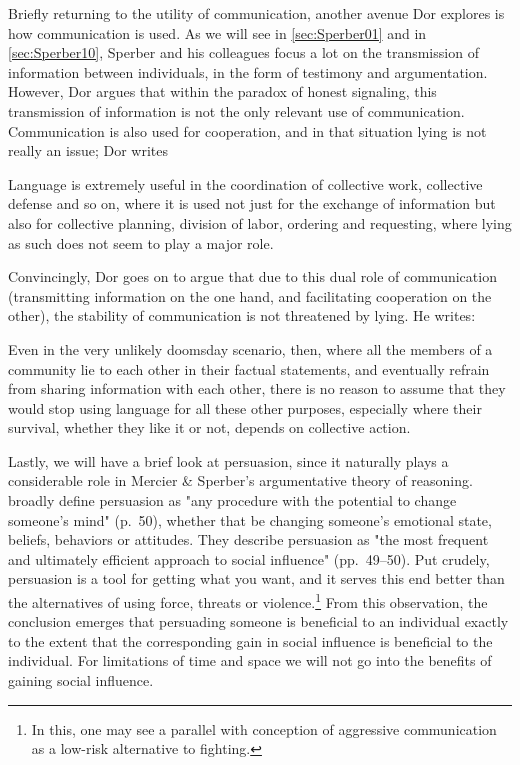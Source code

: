 Briefly returning to the utility of communication, another avenue Dor explores is how communication is used. As we will see in \cref{sec:Sperber01} and in \cref{sec:Sperber10}, Sperber and his colleagues focus a lot on the transmission of information between individuals, in the form of testimony and argumentation. However, Dor argues that within the paradox of honest signaling, this transmission of information is not the only relevant use of communication. Communication is also used for cooperation, and in that situation lying is not really an issue; Dor writes
\begin{quoting}
    Language is extremely useful in the coordination of collective work, collective defense and so on, where it is used not just for the exchange of information but also for collective planning, division of labor, ordering and requesting, where lying as such does not seem to play a major role.
    \hfill \citep[p.~51]{Dor17}
\end{quoting}
Convincingly, Dor goes on to argue that due to this dual role of communication (transmitting information on the one hand, and facilitating cooperation on the other), the stability of communication is not threatened by lying. He writes:
\begin{quoting}
    Even in the very unlikely doomsday scenario, then, where all the members of a community lie to each other in their factual statements, and eventually refrain from sharing information with each other, there is no reason to assume that they would stop using language for all these other purposes, especially where their survival, whether they like it or not, depends on collective action.
    \hfill \citep[p.~52]{Dor17}
\end{quoting}

Lastly, we will have a brief look at persuasion, since it naturally plays a considerable role in Mercier \& Sperber's argumentative theory of reasoning.
\citet{Brinol09} broadly define persuasion as "any procedure with the potential to change someone's mind" (p.~50),
whether that be changing someone's emotional state, beliefs, behaviors or attitudes.
They describe persuasion as "the most frequent and ultimately efficient approach to social influence" (pp.~49--50). Put crudely, persuasion is a tool for getting what you want, and it serves this end better than the alternatives of using force, threats or violence.\footnote{In this, one may see a parallel with  conception of aggressive communication as a low-risk alternative to fighting.}
From this observation, the conclusion emerges that persuading someone is beneficial to an individual exactly to the extent that the corresponding gain in social influence is beneficial to the individual.
For limitations of time and space we will not go into the benefits of gaining social influence.
